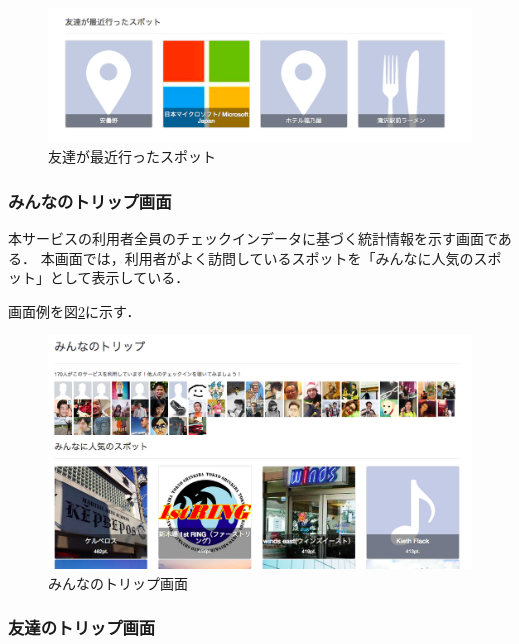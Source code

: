 \documentclass{jsarticle}
\begin{document}
\begin{figure}[!ht]
\begin{center}
\includegraphics[width=12.0cm]{./image/cheekitrip_friends_recently_spot.png}
\caption{友達が最近行ったスポット}
\label{cheekitrip_friends_recently_spot}
\end{center}
\end{figure}

\subsubsection{みんなのトリップ画面}

本サービスの利用者全員のチェックインデータに基づく統計情報を示す画面である．
本画面では，利用者がよく訪問しているスポットを「みんなに人気のスポット」として表示している．

画面例を図\ref{cheekitrip_everyone}に示す．


\begin{figure}[!ht]
\begin{center}
\includegraphics[width=12.0cm]{./image/cheekitrip_everyone.png}
\caption{みんなのトリップ画面}
\label{cheekitrip_everyone}
\end{center}
\end{figure}

\subsubsection{友達のトリップ画面}
\end{document}
